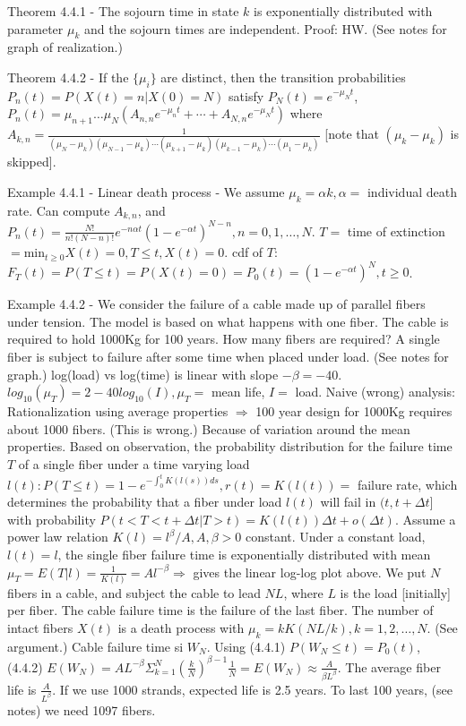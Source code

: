 \documentclass{article}
\begin{document}
Theorem 4.4.1 - The sojourn time in state $k$ is exponentially distributed with parameter $\mu_k$ and the sojourn times are independent. Proof: HW. (See notes for graph of realization.)

Theorem 4.4.2 - If the $\{\mu_i\}$ are distinct, then the transition probabilities $P_n(t) = P(X(t) = n|X(0)=N)$ satisfy $P_N(t) = e^{-\mu_N t}$, $P_n(t) = \mu_{n+1} \dots \mu_N (A_{n,n} e^{-\mu_n t} + \cdots + A_{N,n} e^{-\mu_N t})$ where \\ $A_{k,n} = \frac{1}{(\mu_N - \mu_k) (\mu_{N-1}-\mu_k) \cdots (\mu_{k+1}-\mu_k) (\mu_{k-1}-\mu_k) \cdots (\mu_1 - \mu_k)}$ [note that $(\mu_k - \mu_k)$ is skipped].

Example 4.4.1 - Linear death process - We assume $\mu_k = \alpha k, \alpha =$ individual death rate. Can compute $A_{k,n}$, and $P_n(t) = \frac{N!}{n!(N-n)!} e^{-n \alpha t} (1-e^{-\alpha t})^{N-n}, n = 0, 1, \dots, N$. $T =$ time of extinction $= \mathrm{min}_{t \ge 0} X(t) = 0, T \le t, X(t) = 0$. cdf of $T$: $F_T(t) = P(T \le t) = P(X(t)=0) = P_0(t) = (1-e^{-\alpha t})^N, t \ge 0$.

Example 4.4.2 - We consider the failure of a cable made up of parallel fibers under tension. The model is based on what happens with one fiber. The cable is required to hold 1000Kg for 100 years. How many fibers are required? A single fiber is subject to failure after some time when placed under load. (See notes for graph.) log(load) vs log(time) is linear with slope $ -\beta = -40$. $log_{10}(\mu_T) = 2 - 40 log_{10}(I), \mu_T =$ mean life, $I =$ load. Naive (wrong) analysis: Rationalization using average properties $\Rightarrow$ 100 year design for 1000Kg requires about 1000 fibers. (This is wrong.) Because of variation around the mean properties. Based on observation, the probability distribution for the failure time $T$ of a single fiber under a time varying load $l(t): P(T \le t) = 1 - e^{-\int_0^t K(l(s)) ds}, r(t) = K(l(t)) =$ failure rate, which determines the probability that a fiber under load $l(t)$ will fail in $(t, t + \Delta t]$ with probability $P(t < T < t + \Delta t | T > t) = K(l(t)) \Delta t + o(\Delta t)$. Assume a power law relation $K(l) = l^\beta / A, A, \beta > 0$ constant. Under a constant load, $l(t) = l$, the single fiber failure time is exponentially distributed with mean $\mu_T = E(T|l) = \frac{1}{K(l)} = Al^{-\beta} \Rightarrow$ gives the linear log-log plot above. We put $N$ fibers in a cable, and subject the cable to lead $NL$, where $L$ is the load [initially] per fiber. The cable failure time is the failure of the last fiber. The number of intact fibers $X(t)$ is a death process with $\mu_k = k K(NL / k), k = 1, 2, \dots, N$. (See argument.) Cable failure time si $W_N$. Using (4.4.1) $P(W_N \le t) = P_0(t)$, (4.4.2) $E(W_N) = AL^{-\beta} \Sigma_{k=1}^N (\frac{k}{N})^{\beta-1} \frac{1}{N} = E(W_N) \approx \frac{A}{\beta L^\beta}$. The average fiber life is $\frac{A}{L^\beta}$. If we use 1000 strands, expected life is 2.5 years. To last 100 years, (see notes) we need 1097 fibers.
\end{document}
